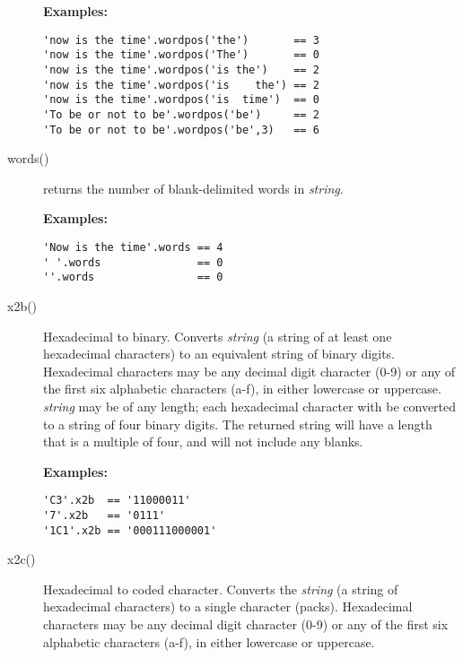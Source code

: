 \begin{description}
\textbf{Examples:}
\begin{lstlisting}
'now is the time'.wordpos('the')       == 3
'now is the time'.wordpos('The')       == 0
'now is the time'.wordpos('is the')    == 2
'now is the time'.wordpos('is    the') == 2
'now is the time'.wordpos('is  time')  == 0
'To be or not to be'.wordpos('be')     == 2
'To be or not to be'.wordpos('be',3)   == 6
\end{lstlisting}

\item[words()]\label{refwords}
returns the number of blank-delimited words in \emph{string}.
 
\textbf{Examples:}
\begin{lstlisting}
'Now is the time'.words == 4
' '.words               == 0
''.words                == 0
\end{lstlisting}

\item[x2b()]\label{refx2b}
Hexadecimal to binary.
Converts \emph{string} (a string of at least one hexadecimal
characters) to an equivalent string of binary digits.
Hexadecimal characters may be any decimal digit character (0-9) or any
of the first six alphabetic characters (a-f), in either lowercase or
uppercase.
 \emph{string} may be of any length; each hexadecimal character
with be converted to a string of four binary digits.
The returned string will have a length that is a multiple of four, and
will not include any blanks.
 
\textbf{Examples:}
\begin{lstlisting}
'C3'.x2b  == '11000011'
'7'.x2b   == '0111'
'1C1'.x2b == '000111000001'
\end{lstlisting}

\item[x2c()]\label{refx2c}
Hexadecimal to coded character.
Converts the \emph{string} (a string of hexadecimal characters) to
a single character (packs).
Hexadecimal characters may be any decimal digit character (0-9) or any
of the first six alphabetic characters (a-f), in either lowercase or
uppercase.
 

\end{description}
